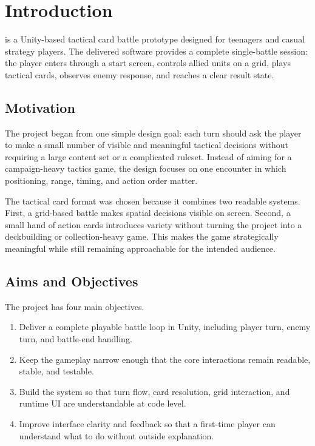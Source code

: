 \chapter{Introduction}

\projectname{} is a Unity-based tactical card battle prototype designed for teenagers and casual strategy players. The delivered software provides a complete single-battle session: the player enters through a start screen, controls allied units on a grid, plays tactical cards, observes enemy response, and reaches a clear result state.

\section{Motivation}

The project began from one simple design goal: each turn should ask the player to make a small number of visible and meaningful tactical decisions without requiring a large content set or a complicated ruleset. Instead of aiming for a campaign-heavy tactics game, the design focuses on one encounter in which positioning, range, timing, and action order matter.

The tactical card format was chosen because it combines two readable systems. First, a grid-based battle makes spatial decisions visible on screen. Second, a small hand of action cards introduces variety without turning the project into a deckbuilding or collection-heavy game. This makes the game strategically meaningful while still remaining approachable for the intended audience.

\section{Aims and Objectives}

The project has four main objectives.

\begin{enumerate}
    \item Deliver a complete playable battle loop in Unity, including player turn, enemy turn, and battle-end handling.
    \item Keep the gameplay narrow enough that the core interactions remain readable, stable, and testable.
    \item Build the system so that turn flow, card resolution, grid interaction, and runtime UI are understandable at code level.
    \item Improve interface clarity and feedback so that a first-time player can understand what to do without outside explanation.
\end{enumerate}

